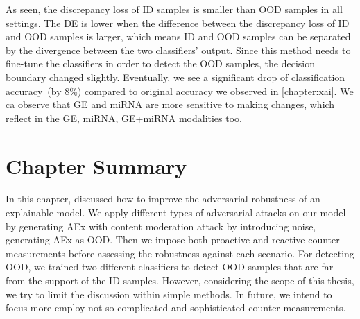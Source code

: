 \hspace*{3.5mm} As seen, the discrepancy loss of ID samples is smaller than OOD samples in all settings. The DE is lower when the difference between the discrepancy loss of ID and OOD samples is larger, which means ID and OOD samples can be separated by the divergence between the two classifiers' output. Since this method needs to fine-tune the classifiers in order to detect the OOD samples, the decision boundary changed slightly. Eventually, we see a significant drop of classification accuracy~(by 8\%) compared to original accuracy we observed in \cref{chapter:xai}. We ca observe that GE and miRNA are more sensitive to making changes, which reflect in the GE, miRNA, GE+miRNA modalities too. 



\section{Chapter Summary} \label{chapter_6:conclusion}
In this chapter, discussed how to improve the adversarial robustness of an explainable model. We apply different types of adversarial attacks on our model by generating AEx with content moderation attack by introducing noise, generating AEx as OOD. Then we impose both proactive and reactive counter measurements before assessing the robustness against each scenario. 
For detecting OOD, we trained two different classifiers to detect OOD samples that are far from the support of the ID samples. However, considering the scope of this thesis, we try to limit the discussion within simple methods. In future, we intend to focus more employ not so complicated and sophisticated counter-measurements. 


